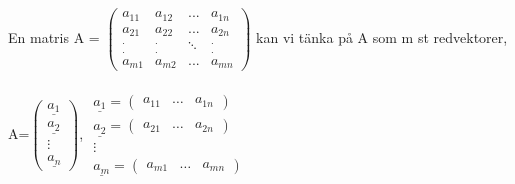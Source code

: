 \documentclass{article}
\begin{document}
        En matris  A = $\begin{pmatrix}
            a_{11} & a_{12} & ... & a_{1n}\\
            a_{21} & a_{22} & ... & a_{2n}\\
            ^{.}_{.} & ^{.}_{.} & \ddots & ^{.}_{.}\\
            a_{m1} & a_{m2} & ... & a_{mn}
        \end{pmatrix}$ kan vi tänka på A som m st redvektorer,\\\\
        A=$\begin{pmatrix}
            \underline{a_{1}}\\
            \underline{a_{2}}\\
            \vdots\\
            \underline{a_{n}}
        \end{pmatrix}$, 
        $\begin{matrix}
            \underline{a_{1}}=\begin{pmatrix}
                a_{11} & \ldots & a_{1n}
            \end{pmatrix}\\
            \underline{a_{2}}=\begin{pmatrix}
                a_{21} & \ldots & a_{2n}
            \end{pmatrix}\\
            \vdots\\
            \underline{a_{m}}=\begin{pmatrix}
                a_{m1} & \ldots & a_{mn}
            \end{pmatrix}
        \end{matrix}$\\
\end{document}
